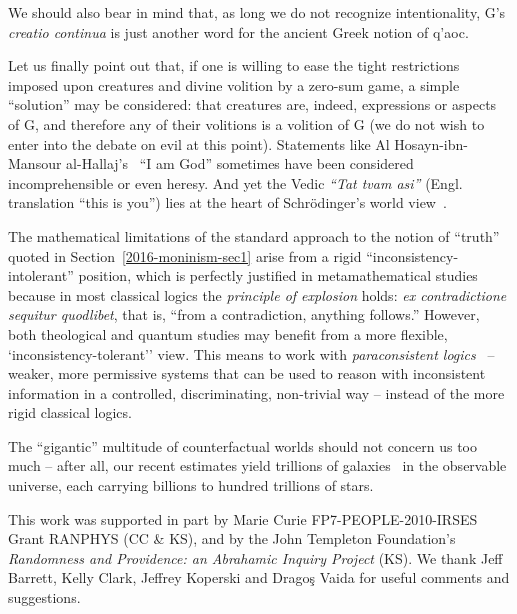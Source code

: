 \documentclass[%
  twocolumn,
 showpacs,
 showkeys,
 preprintnumbers,
 amsmath,amssymb,
 aps,
  pra,
  longbibliography,
 ]{revtex4-1}
\begin{document}
We should also bear in mind that, as long we do not recognize intentionality, G's {\em creatio continua} is just another word for the ancient Greek notion of \textgreek{q'aoc}.


Let us finally point out that, if one is willing to ease the tight restrictions imposed upon creatures and divine volition by a zero-sum game,
a simple ``solution'' may be considered: that creatures are, indeed, expressions or aspects of G, and therefore any of their volitions
is a volition of G
(we do not wish to enter into the debate on evil at this point).
Statements like {A}l {H}osayn-ibn-{M}ansour al-{H}allaj's~\cite{Massignon-1922} ``I am God'' sometimes have been considered incomprehensible or even heresy.
And yet the Vedic {\it ``Tat tvam asi''} (Engl. translation ``this is you'') lies at the heart of Schr\"odinger's world view~\cite[p.~22]{book:1170675}.


The mathematical limitations of the standard approach to the notion of ``truth'' quoted in Section~\ref{2016-moninism-sec1}
arise from a rigid ``inconsistency-intolerant'' position, which is perfectly justified in metamathematical studies because
in most classical logics the {\em principle of explosion} holds:  {\em ex contradictione sequitur quodlibet}, that is,
``from a contradiction, anything follows.'' However,  both
theological and quantum studies may benefit from a more flexible,
 `inconsistency-tolerant'' view.
This means to work with {\em paraconsistent logics}~\cite{sep-logic-paraconsistent} --
weaker, more permissive systems that can be used to reason with inconsistent information in a controlled,
discriminating, non-trivial way -- instead of the more rigid classical logics.


The ``gigantic'' multitude of counterfactual worlds should not
concern us too much -- after all, our recent estimates
yield trillions of galaxies~\cite{0004-637X-830-2-83}
in the observable universe, each carrying  billions to hundred trillions of stars.


\medskip


\begin{acknowledgments}
This work was supported in part by Marie Curie FP7-PEOPLE-2010-IRSES Grant RANPHYS (CC \& KS),
and by the John Templeton Foundation's {\em  Randomness and Providence: an Abrahamic Inquiry Project} (KS). We thank Jeff Barrett, Kelly Clark, Jeffrey Koperski and Drago\c{s} Vaida for useful comments and suggestions.

\end{acknowledgments}


\end{document}
